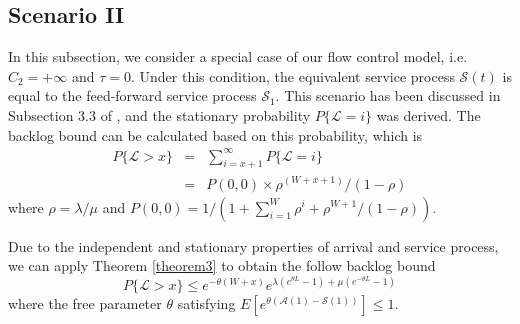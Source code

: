 \documentclass[12pt]{article}
\begin{document}
\subsection{Scenario II}\label{scenario2}
In this subsection, we consider a special case of our flow control model, i.e. $C_2=+\infty$ and $\tau=0$. Under this condition, the equivalent service process $\mathcal{S}(t)$ is equal to the feed-forward service process $\mathcal{S}_1$. This scenario has been discussed in Subsection 3.3 of \cite{jung1996analysis}, and the stationary probability $P\{\mathcal{L}=i\}$ was derived. The backlog bound can be calculated based on this probability, which is
\begin{eqnarray}\label{oldresult}
P\{\mathcal{L}>x\}&=&\sum_{i=x+1}^\infty P\{\mathcal{L}=i\}\nonumber\\
&=& P(0,0)\times\rho^{(W+x+1)}/(1-\rho)
\end{eqnarray}
where $\rho=\lambda/\mu$ and $P(0,0)=1/(1+\sum_{i=1}^W\rho^i+\rho^{W+1}/(1-\rho))$.

Due to the independent and stationary properties of arrival and service process, we can apply Theorem \ref{theorem3} to obtain the follow backlog bound
\begin{equation}\label{newresult}
P\{\mathcal{L}>x\}\leq e^{-\theta(W+x)}e^{\lambda(e^{\theta L}-1)+\mu(e^{-\theta L}-1)}
\end{equation}
where the free parameter $\theta$ satisfying $E[e^{\theta(\mathcal{A}(1)-\mathcal{S}(1))}]\leq 1$.
\end{document}
